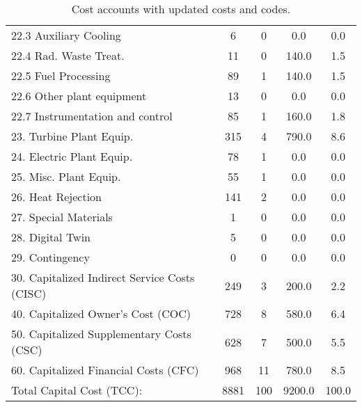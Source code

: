 \begin{table}[h!]
{\begin{tabular}{lcccc}
\hspace{10mm}22.3 Auxiliary Cooling & 6 & 0 & 0.0 & 0.0 \\
\hspace{10mm}22.4 Rad. Waste Treat. & 11 & 0 & 140.0 & 1.5 \\
\hspace{10mm}22.5 Fuel Processing & 89 & 1 & 140.0 & 1.5 \\
\hspace{10mm}22.6 Other plant equipment & 13 & 0 & 0.0 & 0.0 \\
\hspace{10mm}22.7 Instrumentation and control & 85 & 1 & 160.0 & 1.8 \\
\hspace{5mm}23. Turbine Plant Equip. & 315 & 4 & 790.0 & 8.6 \\
\hspace{5mm}24. Electric Plant Equip. & 78 & 1 & 0.0 & 0.0 \\
\hspace{5mm}25. Misc. Plant Equip. & 55 & 1 & 0.0 & 0.0 \\
\hspace{5mm}26. Heat Rejection & 141 & 2 & 0.0 & 0.0 \\
\hspace{5mm}27. Special Materials & 1 & 0 & 0.0 & 0.0 \\
\hspace{5mm}28. Digital Twin & 5 & 0 & 0.0 & 0.0 \\
\hspace{5mm}29. Contingency & 0 & 0 & 0.0 & 0.0 \\
30. Capitalized Indirect Service Costs (CISC) & 249 & 3 & 200.0 & 2.2 \\
40. Capitalized Owner’s Cost (COC) & 728 & 8 & 580.0 & 6.4 \\
50. Capitalized Supplementary Costs (CSC) & 628 & 7 & 500.0 & 5.5 \\
60. Capitalized Financial Costs (CFC) & 968 & 11 & 780.0 & 8.5 \\
\hline
Total Capital Cost (TCC): & 8881 & 100 & 9200.0 & 100.0 \\
\hline
\end{tabular}
}
\caption{Cost accounts with updated costs and codes. }
\label{tab:costsupdatedcodes}
\end{table}


